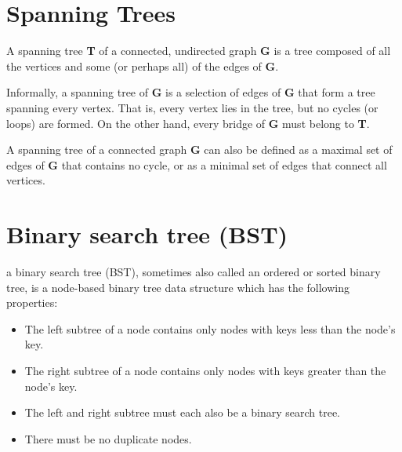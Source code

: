 
		

\section{Spanning Trees}
A spanning tree \textbf{T} of a connected, undirected graph \textbf{G} is a tree composed of all the vertices and some (or perhaps all) of the edges of \textbf{G}. 

Informally, a spanning tree of \textbf{G} is a selection of edges of \textbf{G} that form a tree spanning every vertex. That is, every vertex lies in the tree, but no cycles (or loops) are formed. On the other hand, every bridge of \textbf{G} must belong to \textbf{T}.

A spanning tree of a connected graph \textbf{G} can also be defined as a maximal set of edges of \textbf{G} that contains no cycle, or as a minimal set of edges that connect all vertices.


\section{Binary search tree (BST)}
a binary search tree (BST), sometimes also called an ordered or sorted binary tree, is a node-based binary tree data structure which has the following properties:

\begin{itemize}
\item The left subtree of a node contains only nodes with keys less than the node's key.
\item The right subtree of a node contains only nodes with keys greater than the node's key.
\item The left and right subtree must each also be a binary search tree.
\item There must be no duplicate nodes.
\end{itemize}
